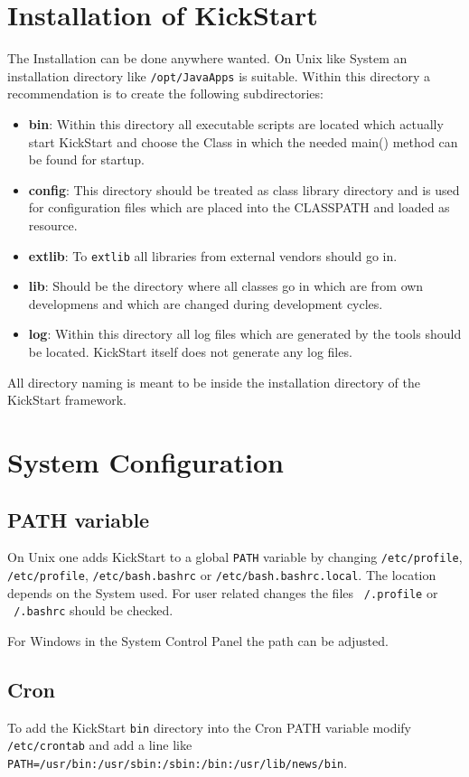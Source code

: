 \documentclass[a4paper,10pt]{book}
\begin{document}
\chapter{Installation of KickStart}
The Installation can be done anywhere wanted. On Unix like System an installation directory like \texttt{/opt/JavaApps} is suitable. Within this directory a recommendation is to create the following subdirectories:
\begin{itemize}
\item \textbf{bin}: Within this directory all executable scripts are located which actually start KickStart and choose the Class in which the needed main() method can be found for startup.
\item \textbf{config}: This directory should be treated as class library directory and is used for configuration files which are placed into the CLASSPATH and loaded as resource.
\item \textbf{extlib}: To \texttt{extlib} all libraries from external vendors should go in.
\item \textbf{lib}: Should be the directory where all classes go in which are from own developmens and which are changed during development cycles.
\item \textbf{log}: Within this directory all log files which are generated by the tools should be located. KickStart itself does not generate any log files.
\end{itemize}
All directory naming is meant to be inside the installation directory of the KickStart framework.

\chapter{System Configuration}

\section{PATH variable}
On Unix one adds KickStart to a global \texttt{PATH} variable by changing \texttt{/etc/profile}, \texttt{/etc/profile}, \texttt{/etc/bash.bashrc} or \texttt{/etc/bash.bashrc.local}. The location depends on the System used. For user related changes the files \texttt{~/.profile} or \texttt{~/.bashrc} should be checked.

For Windows in the System Control Panel the path can be adjusted.

\section{Cron}
To add the KickStart \texttt{bin} directory into the Cron PATH variable modify \texttt{/etc/crontab} and add a line like \texttt{PATH=/usr/bin:/usr/sbin:/sbin:/bin:/usr/lib/news/bin}.
\end{document}
